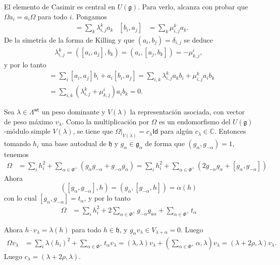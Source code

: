 \documentclass[11pt,fleqn]{article}
\newcommand\CC{\mathbb C}
\newcommand\id{\mathsf{Id}}
\newcommand\g{\mathfrak g}
\newcommand\h{\mathfrak h}
\newcommand\wt{\mathsf{wt}}
\begin{document}
El elemento de Casimir es central en $U(\g)$. Para verlo,
alcanza con probar que $\Omega a_i = a_i \Omega$ para todo $i$. Pongamos
\begin{align*}
	[a_i, a_j] &= \sum_k \lambda^k_{i,j} a_k & [b_i, a_j] &= \sum_k \mu^k_{i,j} a_k.
\end{align*}
De la simetría de la forma de Killing y que $(a_i, b_j) = \delta_{i,j}$ se deduce
\begin{align*}
	\lambda^k_{i,j} = ([a_i, a_j], b_k) = (a_i, [a_j, b_k]) = -\mu_{k,j}^i,
\end{align*}
y por lo tanto
\begin{align*}
	[\Omega, a_j] &= \sum_{i} [a_i, a_j]b_i + a_i[b_i, a_j] = \sum_{i,k} \lambda^k_{i,j}
	a_k b_i + \mu_{i,j}^k a_ib_k \\
	&= \sum_{i,k} (\lambda^k_{i,j} + \mu^i_{k,j})a_ib_k = 0.
\end{align*}

Sea $\lambda \in \Lambda^\wt$ un peso dominante y $V(\lambda)$ la representación 
asociada, con vector de peso máximo $v_\lambda$. Como la multiplicación por $\Omega$ es 
un endomorfismo del $U(\g)$-módulo simple $V(\lambda)$, se tiene que 
$\Omega|_{V(\lambda)} = c_\lambda \id$ para algún $c_\lambda \in \CC$. Entonces tomando 
$h_i$ una base autodual de $\h$ y $g_\alpha \in \g_\alpha$ de forma que $(g_\alpha, 
g_{-\alpha}) = 1$, tenemos
\begin{align*}
	\Omega 
		&= \sum_i h_i^2 + \sum_{\alpha \in \Phi^+} (g_\alpha g_{-\alpha} + g_{-\alpha}
		g_\alpha) = \sum_i h_i^2 + \sum_{\alpha \in \Phi^+} (2g_{-\alpha} g_\alpha 
			+ [g_\alpha, g_{-\alpha}])
\end{align*}
Ahora 
\[
([g_\alpha, g_{-\alpha}], h) = (g_\alpha, [g_{-\alpha}, h]) = \alpha(h)
\]
con lo cual $[g_\alpha, g_{-\alpha}] = t_\alpha$, y por lo tanto
\begin{align*}
	\Omega &= \sum_i h_i^2 + 2\sum_{\alpha \in \Phi^+}g_{-\alpha}g_{a\alpha} + \sum_{\alpha \in \Phi^+} t_\alpha
\end{align*}

Ahora $h \cdot v_\lambda = \lambda(h)$ para todo $h \in \h$, y $g_\alpha v_\lambda \in 
V_{\lambda + \alpha} = 0$. Luego
\begin{align*}
	\Omega v_\lambda &= \sum_i \lambda(h_i)^2 + \sum_{\alpha \in \Phi^+} t_{\alpha} v_\lambda 
	= (\lambda, \lambda)v_\lambda + \left(\sum_{\alpha \in \Phi^+} \alpha, \lambda\right)v_\lambda
	=	(\lambda + 2\rho, \lambda)v_\lambda.
\end{align*}
Luego $c_\lambda = (\lambda + 2 \rho, \lambda)$. 
\end{document}
